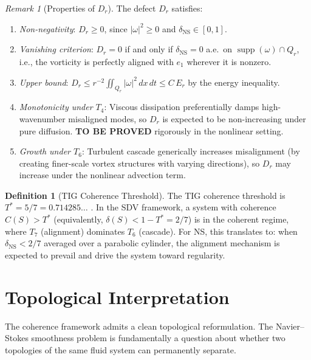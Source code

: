 \documentclass[11pt]{article}
\theoremstyle{definition}
\newtheorem{definition}[theorem]{Definition}
\theoremstyle{remark}
\newtheorem{remark}[theorem]{Remark}
\DeclareMathOperator{\supp}{supp}
\begin{document}
\begin{remark}[Properties of $D_r$]
The defect $D_r$ satisfies:
\begin{enumerate}[nosep]
  \item \emph{Non-negativity}: $D_r \geq 0$, since $|\omega|^2 \geq 0$ and
    $\delta_{\mathrm{NS}} \in [0,1]$.
  \item \emph{Vanishing criterion}: $D_r = 0$ if and only if
    $\delta_{\mathrm{NS}} = 0$ a.e.\ on $\supp(\omega) \cap Q_r$, i.e., the
    vorticity is perfectly aligned with $e_1$ wherever it is nonzero.
  \item \emph{Upper bound}: $D_r \leq r^{-2}\iint_{Q_r} |\omega|^2\, dx\, dt
    \leq C\, E_r$ by the energy inequality.
  \item \emph{Monotonicity under $T_4$}: Viscous dissipation preferentially damps
    high-wavenumber misaligned modes, so $D_r$ is expected to be non-increasing
    under pure diffusion.  \textbf{TO BE PROVED} rigorously in the nonlinear setting.
  \item \emph{Growth under $T_6$}: Turbulent cascade generically increases
    misalignment (by creating finer-scale vortex structures with varying directions),
    so $D_r$ may increase under the nonlinear advection term.
\end{enumerate}
\end{remark}

\begin{definition}[TIG Coherence Threshold]
\label{def:Tstar}
The TIG coherence threshold is $T^* = 5/7 = 0.714285\ldots$ .  In the SDV framework,
a system with coherence $C(S) > T^*$ (equivalently, $\delta(S) < 1 - T^* = 2/7$) is
in the coherent regime, where $T_7$ (alignment) dominates $T_6$ (cascade).  For NS,
this translates to: when $\delta_{\mathrm{NS}} < 2/7$ averaged over a parabolic
cylinder, the alignment mechanism is expected to prevail and drive the system toward
regularity.
\end{definition}

\section{Topological Interpretation}
\label{sec:topology}

The coherence framework admits a clean topological reformulation.
The Navier--Stokes smoothness problem is fundamentally a question
about whether two topologies of the same fluid system can permanently
separate.
\end{document}
